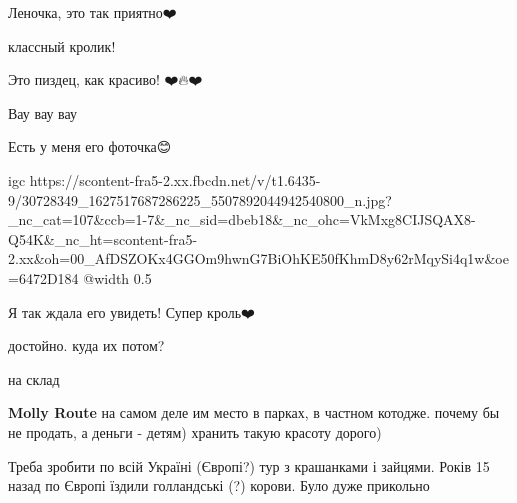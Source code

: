\begin{itemize} %
Леночка, это так приятно❤️
\end{itemize} %


классный кролик!


Это пиздец, как красиво! ❤️🔥❤️


Вау вау вау


Есть у меня его фоточка😊


\ifcmt
  igc https://scontent-fra5-2.xx.fbcdn.net/v/t1.6435-9/30728349_1627517687286225_5507892044942540800_n.jpg?_nc_cat=107&ccb=1-7&_nc_sid=dbeb18&_nc_ohc=VkMxg8CIJSQAX8-Q54K&_nc_ht=scontent-fra5-2.xx&oh=00_AfDSZOKx4GGOm9hwnG7BiOhKE50fKhmD8y62rMqySi4q1w&oe=6472D184
	@width 0.5
\fi


Я так ждала его увидеть! Супер кроль❤️


достойно. куда их потом?

\begin{itemize} %

на склад

\textbf{Molly Route} на самом деле им место в парках, в частном котодже. почему бы не продать, а деньги - детям) хранить такую красоту дорого)
\end{itemize} %


Треба зробити по всій Україні (Європі?) тур з крашанками і зайцями. Років 15
назад по Європі їздили голландські (?) корови. Було дуже прикольно

